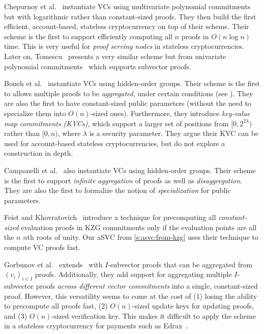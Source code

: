 Chepurnoy et al.~\cite{CPZ18} instantiate VCs using multivariate polynomial commitments~\cite{PST13} but with logarithmic rather than constant-sized proofs.
They then build the first efficient, account-based, stateless cryptocurrency on top of their scheme.
Their scheme is the first to support efficiently computing all $n$ proofs in $O(n\log{n})$ time.
This is very useful for \textit{proof serving nodes} in stateless cryptocurrencies.
Later on, Tomescu~\cite{Tomescu20} presents a very similar scheme but from univariate polynomial commitments~\cite{KZG10a} which supports subvector proofs.

Boneh et al.~\cite{BBF19} instantiate VCs using hidden-order groups.
Their scheme is the first to allows multiple proofs to be \textit{aggregated}, under certain conditions (see \cite[Sec. 5.2, p. 20]{BBF18}).
They are also the first to have constant-sized public parameters (without the need to specialize them into $O(n)$-sized ones).
Furthermore, they introduce \textit{key-value map commitments (KVCs)}, which support a larger set of positions from $[0, 2^{2\lambda})$ rather than $[0,n)$, where $\lambda$ is a security parameter.
They argue their KVC can be used for account-based stateless cryptocurrencies, but do not explore a construction in depth.

Campanelli et al.~\cite{CFG+20} also instantiate VCs using hidden-order groups.
Their scheme is the first to support \textit{infinite aggregation} of proofs as well as \textit{disaggregation}.
They are also the first to formalize the notion of \textit{specialization} for public parameters.

Feist and Khovratovich~\cite{FK20} introduce a technique for precomputing all \textit{constant-sized} evaluation proofs in KZG commitments only if the evaluation points are all the $n$ $n$th roots of unity.
Our aSVC from \cref{s:asvc:from-kzg} uses their technique to compute VC proofs fast.

Gorbunov et al.~\cite{GRWZ20} extends~\cite{LY10} with $I$-subvector proofs that can be aggregated from $(v_i)_{i\in I}$ proofs.
Additionally, they add support for aggregating multiple $I$-subvector proofs \textit{across different vector commitments} into a single, constant-sized proof.
However, this versatility seems to come at the cost of (1) losing the ability to precompute all proofs fast, (2) $O(n)$-sized update keys for updating proofs, and (3) $O(n)$-sized verification key.
This makes it difficult to apply the scheme in a stateless cryptocurrency for payments such as Edrax~\cite{CPZ18}.

